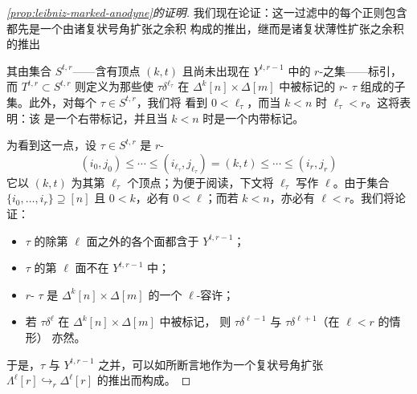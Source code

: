 \begin{proof}[\cref{prop:leibniz-marked-anodyne}的证明]
我们现在论证：这一过滤中的每个正则包含都先是一个由诸复状号角扩张之余积
构成的推出，继而是诸复状薄性扩张之余积的推出
\begin{center}
\end{center}
其由集合 $S^{t,r}$——含有顶点 $(k,t)$ 且尚未出现在 $Y^{t,r-1}$ 中的
$r$-\trSimplex{}之集——标引，而 $T^{t,r}\subset S^{t,r}$ 则定义为那些使
$\tau\delta^{\ell_{\tau}}$ 在 $\Delta^{k}[n]\times\Delta[m]$ 中被标记的
$r$-\trSimplex{} $\tau$ 组成的子集。此外，对每个 $\tau\in S^{t,r}$，我们将
看到 $0<\ell_{\tau}$，而当 $k<n$ 时 $\ell_{\tau}<r$。这将表明：该\trLeibnizProduct
是一个右带标记\trAnodyneExtension，并且当 $k<n$ 时是一个内带标记\trAnodyneExtension。

为看到这一点，设 $\tau\in S^{t,r}$ 是 $r$-\trSimplex{}
\[ (i_{0},j_{0})\le\cdots\le(i_{\ell_{\tau}},j_{\ell_{\tau}})=(k,t)
   \le\cdots\le(i_{r},j_{r}) \]
它以 $(k,t)$ 为其第 $\ell_{\tau}$ 个顶点；为便于阅读，下文将 $\ell_{\tau}$
写作 $\ell$。由于集合 $\{i_{0},\dots,i_{r}\}\supseteq[n]$ 且 $0<k$，必有
$0<\ell$；而若 $k<n$，亦必有 $\ell<r$。我们将论证：
\begin{itemize}
\item $\tau$ 的除第 $\ell$ 面之外的各个面都含于 $Y^{t,r-1}$；
\item $\tau$ 的第 $\ell$ 面不在 $Y^{t,r-1}$ 中；
\item $r$-\trSimplex{} $\tau$ 是 $\Delta^{k}[n]\times\Delta[m]$ 的一个
  $\ell$-容许\trSimplex；
\item 若 $\tau\delta^{\ell}$ 在 $\Delta^{k}[n]\times\Delta[m]$ 中被标记，
  则 $\tau\delta^{\ell-1}$ 与 $\tau\delta^{\ell+1}$（在 $\ell<r$ 的情形）
  亦然。
\end{itemize}
于是，$\tau$ 与 $Y^{t,r-1}$ 之并，可以如所断言地作为一个复状号角扩张
$\Lambda^{\ell}[r]\hookrightarrow_{r}\Delta^{\ell}[r]$ 的推出而构成。


\end{proof}
